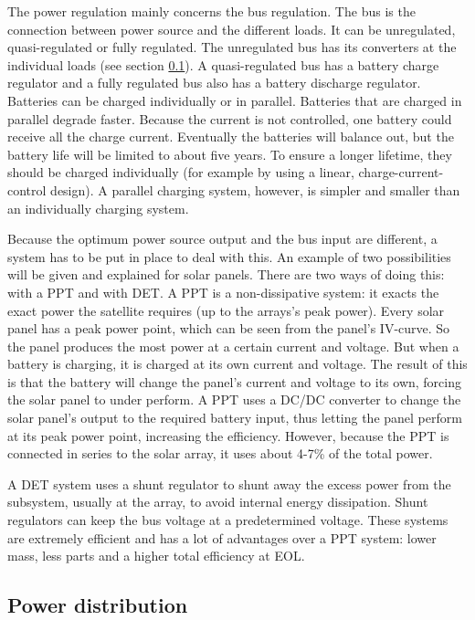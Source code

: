 The power regulation mainly concerns the bus regulation. The bus is the connection between power source and the different loads. It can be unregulated, quasi-regulated or fully regulated. The unregulated bus has its converters at the individual loads (see section \ref{blDOdistribution}). A quasi-regulated bus has a battery charge regulator and a fully regulated bus also has a battery discharge regulator. Batteries can be charged individually or in parallel. Batteries that are charged in parallel degrade faster. Because the current is not controlled, one battery could receive all the charge current. Eventually the batteries will balance out, but the battery life will be limited to about five years. To ensure a longer lifetime, they should be charged individually (for example by using a linear, charge-current-control design). A parallel charging system, however, is simpler and smaller than an individually charging system.

Because the optimum power source output and the bus input are different, a system has to be put in place to deal with this. An example of two possibilities will be given and explained for solar panels. There are two ways of doing this: with a \ac{PPT} and with \ac{DET}. 
A \ac{PPT} is a non-dissipative system: it exacts the exact power the satellite requires (up to the arrays's peak power). Every solar panel has a peak power point, which can be seen from the panel's IV-curve. So the panel produces the most power at a certain current and voltage. But when a battery is charging, it is charged at its own current and voltage. The result of this is that the battery will change the panel's current and voltage to its own, forcing the solar panel to under perform. A \ac{PPT} uses a DC/DC converter to change the solar panel's output to the required battery input, thus letting the panel perform at its peak power point, increasing the efficiency. However, because the \ac{PPT} is connected in series to the solar array, it uses about 4-7\% of the total power.

A \ac{DET} system uses a shunt regulator to shunt away the excess power from the subsystem, usually at the array, to avoid internal energy dissipation. Shunt regulators can keep the bus voltage at a predetermined voltage. These systems are extremely efficient and has a lot of advantages over a \ac{PPT} system: lower mass, less parts and a higher total efficiency at \ac{EOL}.

\subsection{Power distribution}
\label{blDOdistribution}

